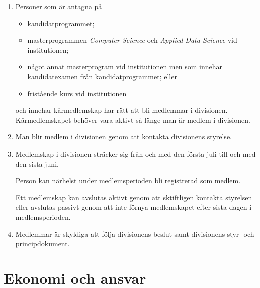 \documentclass{dvd}
\begin{document}
	\begin{enumerate}[label=\arabic* §, ref=\arabic*]

		\item Personer som är antagna på

		\begin{itemize}
			\item kandidatprogrammet;

			\item masterprogrammen \emph{Computer Science} och \emph{Applied Data Science} vid institutionen;

			\item något annat masterprogram vid institutionen men som innehar kandidatexamen från kandidatprogrammet; eller

			\item fristående kurs vid institutionen
		\end{itemize}

		och innehar kårmedlemskap har rätt att bli medlemmar i divisionen.
		Kårmedlemskapet behöver vara aktivt så länge man är medlem i divisionen.

		\item Man blir medlem i divisionen genom att kontakta divisionens styrelse.

		\item Medlemskap i divisionen sträcker sig från och med den första juli till och med den sista juni.

		Person kan närhelst under medlemsperioden bli registrerad som medlem.

		Ett medlemskap kan avslutas aktivt genom att sktiftligen kontakta styrelsen eller avslutas passivt genom att inte förnya medlemskapet efter sista dagen i medlemsperioden.

		\item Medlemmar är skyldiga att följa divisionens beslut samt divisionens styr- och principdokument.
	\end{enumerate}

	\section{Ekonomi och ansvar}
\end{document}

